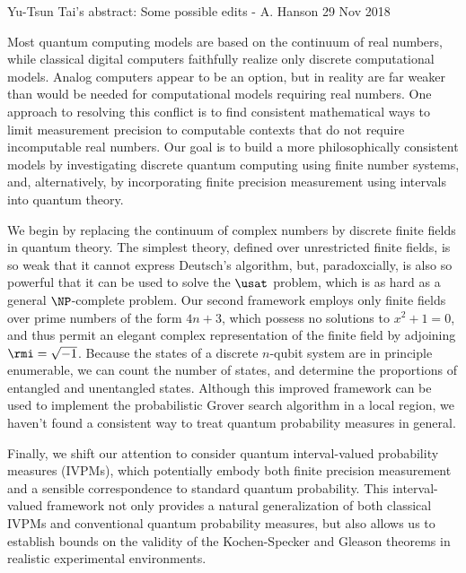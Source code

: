 Yu-Tsun Tai's abstract:
   Some possible edits - A. Hanson  29 Nov 2018

\begin{abstract*}

Most quantum computing models are based on
the continuum of real numbers, while classical digital
computers faithfully realize only discrete computational
models.   Analog computers appear to be an option, but in reality are
far weaker than would be needed for computational models requiring
real numbers.   One approach to resolving this conflict is to
find consistent mathematical ways to limit measurement precision
to computable contexts that do not require incomputable real numbers.
Our goal is to build a more philosophically consistent models by
investigating discrete quantum computing using finite number systems, 
and, alternatively, by incorporating finite precision measurement
using intervals into quantum theory.

We begin by replacing the continuum of complex numbers by discrete
finite fields in quantum theory. The simplest theory, defined over
unrestricted finite fields, is so weak that it cannot express
Deutsch's algorithm, but, paradoxcially, is also so powerful that it
can be used to solve the $\usat$ problem, which is as hard as a
general $\NP$-complete problem.  Our second framework employs only
finite fields over prime numbers of the form $4n+3$, which possess no
solutions to $x^{2}+1=0$, and thus permit an elegant complex
representation of the finite field by adjoining
$\rmi=\sqrt{-1}$. Because the states of a discrete $n$-qubit system
are in principle enumerable, we can count the number of states, and
determine the proportions of entangled and unentangled
states. Although this improved framework can be used to implement the
probabilistic Grover search algorithm in a local region, we haven't
found a consistent way to treat quantum probability measures
in general.

Finally, we shift our attention
to consider quantum interval-valued probability measures (IVPMs),
which potentially embody both finite precision measurement and
a sensible correspondence to standard quantum probability.
This interval-valued framework not only provides a natural generalization
of both classical IVPMs and conventional quantum probability measures,
but also allows us to establish bounds on the validity of the Kochen-Specker
and Gleason theorems in realistic experimental environments.

\end{abstract*}

